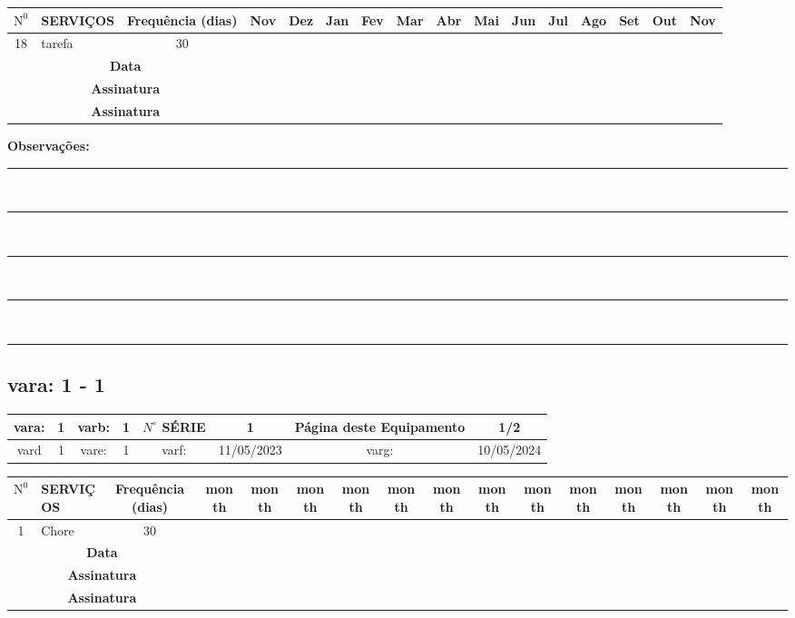 \documentclass[a4paper, 12pt]{article}
\begin{document}
\begin{adjustbox}{width=18cm ,center}
\begin{tabular}{|c|p{12cm}|c|c|c|c|c|c|c|c|c|c|c|c|c|c|}
\hline $\mathrm{N}^0$ & SERVIÇOS & Frequência (dias) & Nov & Dez & Jan & Fev & Mar & Abr & Mai & Jun & Jul & Ago & Set & Out & Nov \\
\hline 18 & tarefa & 30 & & & & & & & & & & & & & \\
\hline
\multicolumn{3}{|c|}{\textbf{Data }} &  & & & & & & & &  &  & &  &  \\
\hline \multicolumn{3}{|c|}{\textbf{Assinatura }} &  & & & & & & & & & &   &  &  \\
\hline \multicolumn{3}{|c|}{\textbf{Assinatura }} &  & & & & & & & & & &   &  &  \\
\hline
\end{tabular}
\end{adjustbox}


\footnotesize\textbf{Observações:}\\[0.1cm]
\noindent\rule{\textwidth}{0.2mm} \\[0.1cm]
\noindent\rule{\textwidth}{0.2mm} \\[0.1cm]
\noindent\rule{\textwidth}{0.2mm} \\[0.1cm]
\noindent\rule{\textwidth}{0.2mm} \\[0.1cm]
\noindent\rule{\textwidth}{0.2mm}
\newpage
\subsection{vara: 1 - 1}



\begin{adjustbox}{width=18cm ,center}
\begin{tabular}{|c|c|c|c|c|c|c|c|}
\hline vara: & 1 & varb: & 1 & $N^{\circ}$ SÉRIE & 1 & \textbf{Página deste Equipamento} & \textbf{1/2} \\
\hline vard & 1 & vare: & 1 & varf: & 11/05/2023 & varg: & 10/05/2024 \\
\hline
\end{tabular}
\end{adjustbox}

\begin{adjustbox}{width=18cm ,center}
\begin{tabular}{|c|p{12cm}|c|c|c|c|c|c|c|c|c|c|c|c|c|c|}
\hline $\mathrm{N}^0$ & SERVIÇOS & Frequência (dias) & month & month & month & month & month & month & month & month & month & month & month & month & month \\
\hline 1 &  Chore & 30 &  &  & &  & &  &  & &  & &  &  &  \\
\hline
\hline
\multicolumn{3}{|c|}{\textbf{Data }} &  & & & & & & & &  &  & &  &  \\
\hline \multicolumn{3}{|c|}{\textbf{Assinatura }} &  & & & & & & & & & &   &  &  \\
\hline \multicolumn{3}{|c|}{\textbf{Assinatura }} &  & & & & & & & & & &   &  &  \\
\hline
\end{tabular}
\end{adjustbox}
\end{document}
